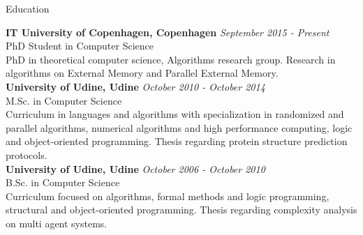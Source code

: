 \documentclass{resume} %
\begin{document}
\begin{rSection}{Education}

{\bf IT University of Copenhagen, Copenhagen} \hfill {\em September 2015 - Present} \\ 
PhD Student in Computer Science \\
PhD in theoretical computer science, Algorithms research group. Research in algorithms on External Memory and Parallel External Memory. \\

{\bf University of Udine, Udine} \hfill {\em October 2010 - October 2014}\\ 
M.Sc. in Computer Science \\
Curriculum in languages and algorithms with specialization in randomized and parallel algorithms, numerical algorithms and high performance computing, logic and object-oriented programming. Thesis regarding protein structure prediction protocols.\\

{\bf University of Udine, Udine} \hfill {\em October 2006 - October 2010}\\ 
B.Sc. in Computer Science \\
Curriculum focused on algorithms, formal methods and logic programming, structural and object-oriented programming. Thesis regarding complexity analysis on multi agent systems.\\


\end{rSection}


\pagebreak
\end{document}
